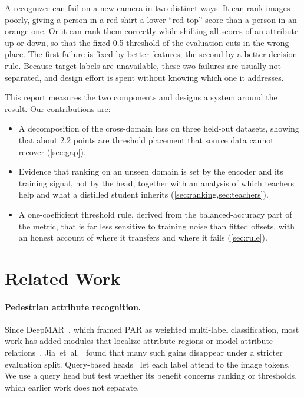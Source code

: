 \documentclass[10pt,twocolumn,letterpaper]{article}
\newcommand{\etal}{et~al.}
\begin{document}
A recognizer can fail on a new camera in two distinct ways. It can rank images poorly, giving a person in a red shirt a lower ``red top'' score than a person in an orange one. Or it can rank them correctly while shifting all scores of an attribute up or down, so that the fixed 0.5 threshold of the evaluation cuts in the wrong place. The first failure is fixed by better features; the second by a better decision rule. Because target labels are unavailable, these two failures are usually not separated, and design effort is spent without knowing which one it addresses.

This report measures the two components and designs a system around the result. Our contributions are:
\begin{itemize}
\item A decomposition of the cross-domain loss on three held-out datasets, showing that about 2.2 points are threshold placement that source data cannot recover (\cref{sec:gap}).
\item Evidence that ranking on an unseen domain is set by the encoder and its training signal, not by the head, together with an analysis of which teachers help and what a distilled student inherits (\cref{sec:ranking,sec:teachers}).
\item A one-coefficient threshold rule, derived from the balanced-accuracy part of the metric, that is far less sensitive to training noise than fitted offsets, with an honest account of where it transfers and where it fails (\cref{sec:rule}).
\end{itemize}

\section{Related Work}

\paragraph{Pedestrian attribute recognition.} Since DeepMAR~\cite{deepmar}, which framed PAR as weighted multi-label classification, most work has added modules that localize attribute regions or model attribute relations~\cite{parsurvey}. Jia~\etal~\cite{rethinkpar} found that many such gains disappear under a stricter evaluation split. Query-based heads~\cite{q2l,mldecoder} let each label attend to the image tokens. We use a query head but test whether its benefit concerns ranking or thresholds, which earlier work does not separate.
\end{document}
